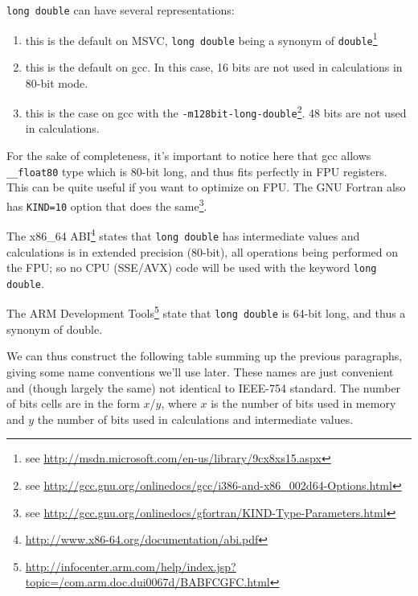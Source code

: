 
\texttt{long double} can have several representations:
\begin{enumerate}
\item[\enumstyle{64-bit}] this is the default on MSVC, \texttt{long double} being a synonym of \texttt{double}\footnote{see \url{http://msdn.microsoft.com/en-us/library/9cx8xs15.aspx}}
\item[\enumstyle{96-bit}] this is the default on gcc. In this case, 16 bits are not used in calculations in 80-bit mode.
\item[\enumstyle{128-bit}] this is the case on gcc with the \texttt{-m128bit-long-double}\footnote{see \url{http://gcc.gnu.org/onlinedocs/gcc/i386-and-x86\_002d64-Options.html}}. 48 bits are not used in calculations.
\end{enumerate}

For the sake of completeness, it's important to notice here that gcc allows \texttt{\_\_float80} type which is 80-bit long, and thus fits perfectly in FPU registers. This can be quite useful if you want to optimize on FPU. The GNU Fortran also has \texttt{KIND=10} option that does the same\footnote{see \url{http://gcc.gnu.org/onlinedocs/gfortran/KIND-Type-Parameters.html}}.


The x86\_64 ABI\footnote{\url{http://www.x86-64.org/documentation/abi.pdf}} states that \texttt{long double} has intermediate values and calculations is in extended precision (80-bit), all operations being performed on the FPU; so no CPU (SSE/AVX) code will be used with the keyword \texttt{long double}.

The ARM Development Tools\footnote{\url{http://infocenter.arm.com/help/index.jsp?topic=/com.arm.doc.dui0067d/BABFCGFC.html}} state that \texttt{long double} is 64-bit long, and thus a synonym of double.


We can thus construct the following table summing up the previous paragraphs, giving some name conventions we'll use later. These names are just convenient and (though largely the same) not identical to IEEE-754 standard. The number of bits cells are in the form $x$/$y$, where $x$ is the number of bits used in memory and $y$ the number of bits used in calculations and intermediate values.

